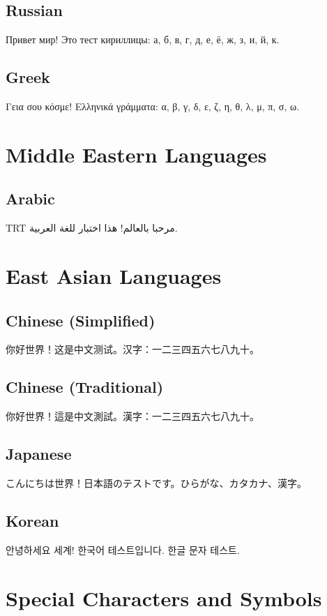 \documentclass[12pt,a4paper]{article}
\newcommand{\textarabic}[1]{{\arabicfont\textdir TRT #1}}
\newcommand{\textcjk}[1]{{\cjkfont #1}}
\begin{document}
\subsection{Russian}
Привет мир! Это тест кириллицы: а, б, в, г, д, е, ё, ж, з, и, й, к.

\subsection{Greek}
Γεια σου κόσμε! Ελληνικά γράμματα: α, β, γ, δ, ε, ζ, η, θ, λ, μ, π, σ, ω.

\section{Middle Eastern Languages}

\subsection{Arabic}
\textarabic{مرحبا بالعالم! هذا اختبار للغة العربية.}

\section{East Asian Languages}

\subsection{Chinese (Simplified)}
\textcjk{你好世界！这是中文测试。汉字：一二三四五六七八九十。}

\subsection{Chinese (Traditional)}
\textcjk{你好世界！這是中文測試。漢字：一二三四五六七八九十。}

\subsection{Japanese}
\textcjk{こんにちは世界！日本語のテストです。ひらがな、カタカナ、漢字。}

\subsection{Korean}
\textcjk{안녕하세요 세계! 한국어 테스트입니다. 한글 문자 테스트.}

\section{Special Characters and Symbols}
\end{document}
